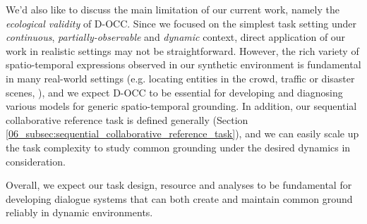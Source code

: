 We'd also like to discuss the main limitation of our current work, namely the \textit{ecological validity} \citep{de2020towards} of D-OCC. Since we focused on the simplest task setting under \textit{continuous}, \textit{partially-observable} and \textit{dynamic} context, direct application of our work in realistic settings may not be straightforward. However, the rich variety of spatio-temporal expressions observed in our synthetic environment is fundamental in many real-world settings (e.g. locating entities in the crowd, traffic or disaster scenes, \citealp{pustejovsky2011iso}), and we expect D-OCC to be essential for developing and diagnosing various models for generic spatio-temporal grounding. In addition, our sequential collaborative reference task is defined generally (Section \ref{06_subsec:sequential_collaborative_reference_task}), and we can easily scale up the task complexity to study common grounding under the desired dynamics in consideration.

Overall, we expect our task design, resource and analyses to be fundamental for developing dialogue systems that can both create and maintain common ground reliably in dynamic environments.